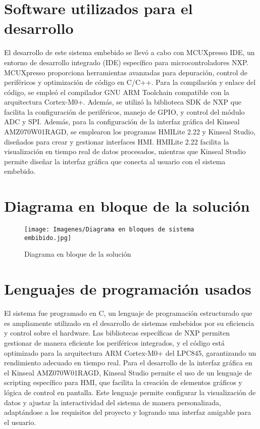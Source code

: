 \section{Software utilizados para el desarrollo}
El desarrollo de este sistema embebido se llevó a cabo con MCUXpresso IDE, un entorno de desarrollo integrado (IDE) específico para microcontroladores NXP. MCUXpresso proporciona herramientas avanzadas para depuración, control de periféricos y optimización de código en C/C++. Para la compilación y enlace del código, se empleó el compilador GNU ARM Toolchain compatible con la arquitectura Cortex-M0+. Además, se utilizó la biblioteca SDK de NXP que facilita la configuración de periféricos, manejo de GPIO, y control del módulo ADC y SPI. Además, para la configuración de la interfaz gráfica del Kinseal AMZ070W01RAGD, se emplearon los programas HMILite 2.22 y Kinseal Studio, diseñados para crear y gestionar interfaces HMI. HMILite 2.22 facilita la visualización en tiempo real de datos procesados, mientras que Kinseal Studio permite diseñar la interfaz gráfica que conecta al usuario con el sistema embebido.

\section{Diagrama en bloque de la solución}

    \begin{figure}[h]
        \centering
        \texttt{[image: Imagenes/Diagrama en bloques de sistema embibido.jpg]}
        \caption{Diagrama en bloque de la solución}
        \label{fig:diagrama_bloque}
    \end{figure}

\section{Lenguajes de programación usados}
El sistema fue programado en C, un lenguaje de programación estructurado que es ampliamente utilizado en el desarrollo de sistemas embebidos por su eficiencia y control sobre el hardware. Las bibliotecas específicas de NXP permiten gestionar de manera eficiente los periféricos integrados, y el código está optimizado para la arquitectura ARM Cortex-M0+ del LPC845, garantizando un rendimiento adecuado en tiempo real. Para el desarrollo de la interfaz gráfica en el Kinseal AMZ070W01RAGD, Kinseal Studio permite el uso de un lenguaje de scripting específico para HMI, que facilita la creación de elementos gráficos y lógica de control en pantalla. Este lenguaje permite configurar la visualización de datos y ajustar la interactividad del sistema de manera personalizada, adaptándose a los requisitos del proyecto y logrando una interfaz amigable para el usuario.

